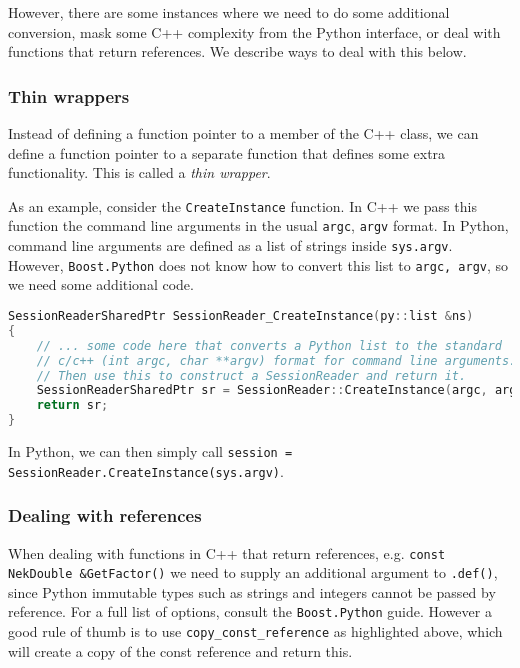 However, there are some instances where we need to do some additional
conversion, mask some C++ complexity from the Python interface, or deal with
functions that return references. We describe ways to deal with this below.

\subsubsection{Thin wrappers}

Instead of defining a function pointer to a member of the C++ class, we can
define a function pointer to a separate function that defines some extra
functionality. This is called a \emph{thin wrapper}.

As an example, consider the \texttt{CreateInstance} function. In C++ we pass this
function the command line arguments in the usual \texttt{argc}, \texttt{argv} format. In
Python, command line arguments are defined as a list of strings inside
\texttt{sys.argv}. However, \texttt{Boost.Python} does not know how to convert this list to
\texttt{argc, argv}, so we need some additional code.

\begin{lstlisting}[caption={Thin wrapper example}, label={lst:thin_wrapper}, language=C++]
SessionReaderSharedPtr SessionReader_CreateInstance(py::list &ns)
{
    // ... some code here that converts a Python list to the standard
    // c/c++ (int argc, char **argv) format for command line arguments.
    // Then use this to construct a SessionReader and return it.
    SessionReaderSharedPtr sr = SessionReader::CreateInstance(argc, argv);
    return sr;
}
\end{lstlisting}

In Python, we can then simply call \texttt{session = SessionReader.CreateInstance(sys.argv)}.

\subsubsection{Dealing with references}

When dealing with functions in C++ that return references, e.g. \texttt{const NekDouble \&GetFactor()} 
we need to supply an additional argument to \texttt{.def()}, since Python immutable
types such as strings and integers cannot be passed by reference. For a full
list of options, consult the \texttt{Boost.Python} guide. However a good rule of thumb
is to use \texttt{copy\_const\_reference} as highlighted above, which will create a copy
of the const reference and return this.

